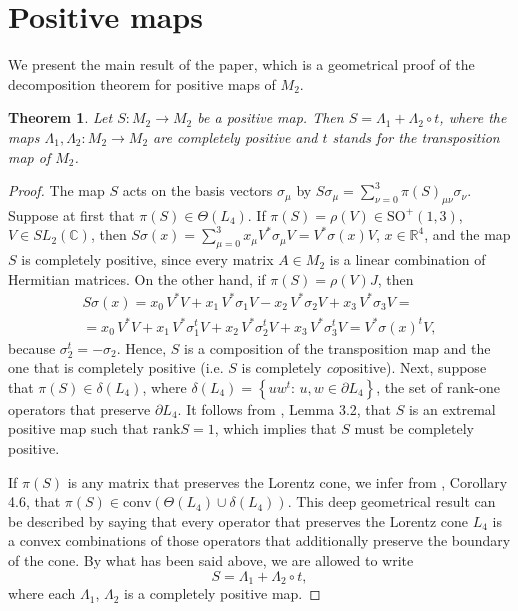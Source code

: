 \documentclass[12pt]{article}
\theoremstyle{plain}
\newtheorem{theorem}{Theorem}
\theoremstyle{definition}
\theoremstyle{remark}
\numberwithin{equation}{section}
\begin{document}
\section{Positive maps}
\label{sec:PositiveMaps}

We present the main result of the paper,
which is a geometrical proof of the decomposition theorem for positive
maps of $M_{2}$.

\begin{theorem}
\label{thm:PositiveMapsOnM2}
    Let $S:M_{2} \rightarrow M_{2}$ be a positive map.
    Then $S = \Lambda_{1}  + \Lambda_{2} \circ t$,
    where the maps
    $\Lambda_{1}, \Lambda_{2}:M_{2} \rightarrow M_{2}$
    are completely positive
    and $t$ stands for the transposition map of $M_{2}$.
\end{theorem}

\begin{proof}
\label{RandomLabel:875919}
  The map $S$ acts on the basis vectors $\sigma_{\mu}$ by
$S \sigma_{\mu} = \sum_{\nu = 0}^{3} \pi(S)_{\mu \nu} \sigma_{\nu}$.
Suppose at first that $\pi(S) \in \Theta(L_{4})$. 
If $\pi(S) = \rho(V) \in \text{SO}^{+}(1,3)$,
$V \in SL_{2}(\mathbb{C})$,
then
$S \sigma(x) = \sum_{\mu = 0}^{3}  x_{\mu} V^{*} \sigma_{\mu} V =
 V^{*} \sigma(x) V$,
 $x \in \mathbb{R}^{4}$,
and the map $S$ is completely positive,
since every matrix $A \in M_{2}$ is a linear combination
of Hermitian matrices.
On the other hand,
if $\pi(S) = \rho(V) J$,
then
\begin{multline}
\label{RandomLabel:830200}
S \sigma(x) =
  x_{0} \, V^{*}V + x_{1} \, V^{*} \sigma_{1} V -
  x_{2} \, V^{*} \sigma_{2} V +
  x_{3} \, V^{*} \sigma_{3} V = \\
  = x_{0} \, V^{*}V + x_{1} \, V^{*} \sigma_{1}^{t} V +
  x_{2} \, V^{*} \sigma_{2}^{t} V +
  x_{3} \, V^{*} \sigma_{3}^{t} V =
  V^{*} \sigma(x)^{t} V,
\end{multline}
because $\sigma_{2}^{t} = - \sigma_{2}$.
Hence, $S$ is a composition of the transposition map and the one that is
completely positive
(i.e. $S$  is completely \emph{co}positive).
Next, suppose that $\pi(S) \in \delta(L_{4})$,
where
$
 \delta(L_{4}) = \left \{ u w^{t}:
 \, u, w \in \partial L_{4}  \right \}
$,
the set of rank-one operators that preserve $\partial L_{4}$.
It follows from 
\cite{loewy1975positive}, Lemma 3.2, that
$S$ is an extremal positive map such that $\text{rank} S = 1$,
which implies that $S$ must be completely positive.

If $\pi(S)$ is any matrix that preserves the Lorentz cone,
we infer from
\cite{loewy1975positive}, Corollary 4.6,
that $\pi(S) \in \text{conv} \left ( \Theta(L_{4}) \cup \delta(L_{4}) \right)$. 
This deep geometrical result can be described by saying that every
operator that preserves the Lorentz cone $L_{4}$ is a convex combinations
of those operators that additionally preserve the boundary of the cone.
By what has been said above,
we are allowed to write
\begin{equation}
\label{RandomLabel:587827}
    S = \Lambda_{1} + \Lambda_{2} \circ t,
\end{equation}
where each $\Lambda_{1}$, $\Lambda_{2}$
is a completely positive map.
\end{proof}
\end{document}
